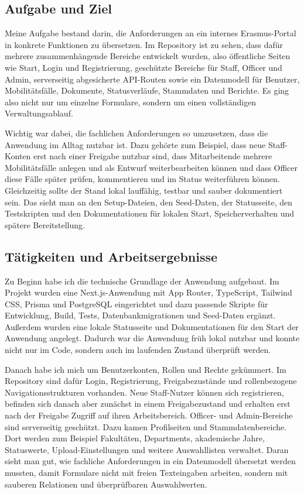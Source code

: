 ﻿\documentclass{Vorlage}
\begin{document}
\subsection{Aufgabe und Ziel}

Meine Aufgabe bestand darin, die Anforderungen an ein internes Erasmus-Portal in konkrete Funktionen zu übersetzen. Im Repository ist zu sehen, dass dafür mehrere zusammenhängende Bereiche entwickelt wurden, also öffentliche Seiten wie Start, Login und Registrierung, geschützte Bereiche für Staff, Officer und Admin, serverseitig abgesicherte API-Routen sowie ein Datenmodell für Benutzer, Mobilitätsfälle, Dokumente, Statusverläufe, Stammdaten und Berichte. Es ging also nicht nur um einzelne Formulare, sondern um einen vollständigen Verwaltungsablauf.

Wichtig war dabei, die fachlichen Anforderungen so umzusetzen, dass die Anwendung im Alltag nutzbar ist. Dazu gehörte zum Beispiel, dass neue Staff-Konten erst nach einer Freigabe nutzbar sind, dass Mitarbeitende mehrere Mobilitätsfälle anlegen und als Entwurf weiterbearbeiten können und dass Officer diese Fälle später prüfen, kommentieren und im Status weiterführen können. Gleichzeitig sollte der Stand lokal lauffähig, testbar und sauber dokumentiert sein. Das sieht man an den Setup-Dateien, den Seed-Daten, der Statusseite, den Testskripten und den Dokumentationen für lokalen Start, Speicherverhalten und spätere Bereitstellung.

\subsection{Tätigkeiten und Arbeitsergebnisse}

Zu Beginn habe ich die technische Grundlage der Anwendung aufgebaut. Im Projekt wurden eine Next.js-Anwendung mit App Router, TypeScript, Tailwind CSS, Prisma und PostgreSQL eingerichtet und dazu passende Skripte für Entwicklung, Build, Tests, Datenbankmigrationen und Seed-Daten ergänzt. Außerdem wurden eine lokale Statusseite und Dokumentationen für den Start der Anwendung angelegt. Dadurch war die Anwendung früh lokal nutzbar und konnte nicht nur im Code, sondern auch im laufenden Zustand überprüft werden.

Danach habe ich mich um Benutzerkonten, Rollen und Rechte gekümmert. Im Repository sind dafür Login, Registrierung, Freigabezustände und rollenbezogene Navigationsstrukturen vorhanden. Neue Staff-Nutzer können sich registrieren, befinden sich danach aber zunächst in einem Freigabezustand und erhalten erst nach der Freigabe Zugriff auf ihren Arbeitsbereich. Officer- und Admin-Bereiche sind serverseitig geschützt. Dazu kamen Profilseiten und Stammdatenbereiche. Dort werden zum Beispiel Fakultäten, Departments, akademische Jahre, Statuswerte, Upload-Einstellungen und weitere Auswahllisten verwaltet. Daran sieht man gut, wie fachliche Anforderungen in ein Datenmodell übersetzt werden mussten, damit Formulare nicht mit freien Texteingaben arbeiten, sondern mit sauberen Relationen und überprüfbaren Auswahlwerten.
\end{document}
